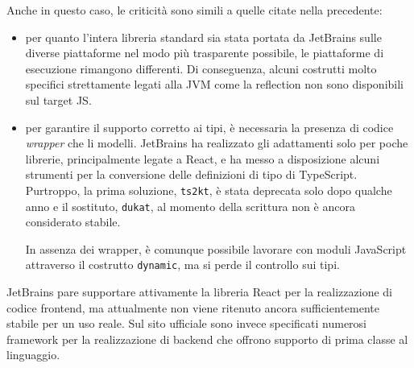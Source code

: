       Anche in questo caso, le criticità sono simili a quelle citate nella  precedente:
      \begin{itemize}
        \item
          per quanto l'intera libreria standard sia stata portata da JetBrains sulle diverse piattaforme nel modo più trasparente possibile, le piattaforme di esecuzione rimangono differenti.
          Di conseguenza, alcuni costrutti molto specifici strettamente legati alla JVM come la reflection non sono disponibili sul target JS\@.
        \item
          per garantire il supporto corretto ai tipi, è necessaria la presenza di codice \emph{wrapper} che li modelli.
          JetBrains ha realizzato gli adattamenti solo per poche librerie, principalmente legate a React, e ha messo a disposizione alcuni strumenti per la conversione delle definizioni di tipo di TypeScript.
          Purtroppo, la prima soluzione, \texttt{ts2kt}, è stata deprecata solo dopo qualche anno e il sostituto, \texttt{dukat}, al momento della scrittura non è ancora considerato stabile.

          In assenza dei wrapper, è comunque possibile lavorare con moduli JavaScript attraverso il costrutto \texttt{dynamic}, ma si perde il controllo sui tipi.
      \end{itemize}

      JetBrains pare supportare attivamente la libreria React per la realizzazione di codice frontend, ma attualmente non viene ritenuto ancora sufficientemente stabile per un uso reale.
      Sul sito ufficiale sono invece specificati numerosi framework per la realizzazione di backend che offrono supporto di prima classe al linguaggio.
